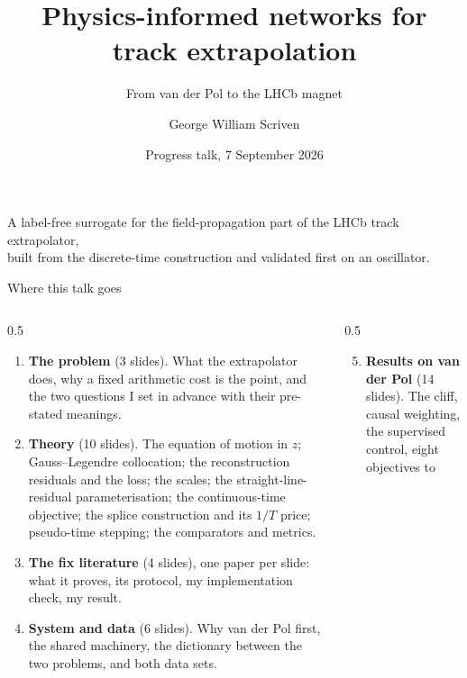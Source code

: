 \documentclass[aspectratio=169,10pt]{beamer}
\title{Physics-informed networks for track extrapolation}
\subtitle{From van der Pol to the LHCb magnet}
\author{George William Scriven}
\institute{\normalsize Maastricht University \quad$\cdot$\quad Hasselt University \quad$\cdot$\quad Nikhef}
\date{Progress talk, 7 September 2026}
\newcommand{\hl}[1]{{\color{accent}\textbf{#1}}}
\begin{document}
{
\begin{frame}[plain]
  \titlepage
  \begin{center}
    {\small\color{black!55}
     A label-free surrogate for the field-propagation part of the LHCb track
     extrapolator,\\ built from the discrete-time construction and validated
     first on an oscillator.}
  \end{center}
\end{frame}}

\begin{frame}[shrink=25]{Where this talk goes}
  \vspace{2mm}
  \begin{columns}[T]
    \begin{column}{0.5\textwidth}
      \begin{enumerate}
        \item \hl{The problem} (3 slides). What the extrapolator does, why a
              fixed arithmetic cost is the point, and the two questions I set in
              advance with their pre-stated meanings.
        \item \hl{Theory} (10 slides). The equation of motion in $z$;
              Gauss--Legendre collocation; the reconstruction residuals and the
              loss; the scales; the straight-line-residual parameterisation; the
              continuous-time objective; the splice construction and its
              $1/T$ price; pseudo-time stepping; the comparators and metrics.
        \item \hl{The fix literature} (4 slides), one paper per slide: what it
              proves, its protocol, my implementation check, my result.
        \item \hl{System and data} (6 slides). Why van der Pol first, the shared
              machinery, the dictionary between the two problems, and both data
              sets.
      \end{enumerate}
    \end{column}
    \begin{column}{0.5\textwidth}
      \begin{enumerate}
        \setcounter{enumi}{4}
        \item \hl{Results on van der Pol} (14 slides). The cliff, causal
              weighting, the supervised control, eight objectives to

\end{enumerate}
\end{column}
\end{columns}
\end{frame}
\end{document}
